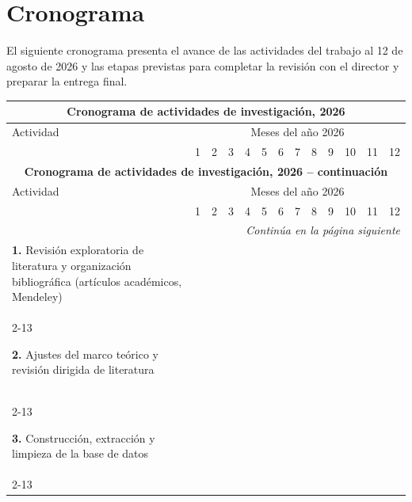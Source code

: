 \documentclass[../../TFM.tex]{subfiles}
\begin{document}

	\chapter*{Cronograma}

	El siguiente cronograma presenta el avance de las actividades del trabajo al
	12 de agosto de 2026 y las etapas previstas para completar la revisión con el
	director y preparar la entrega final.

	\begin{longtable}{|p{6.2cm}|*{12}{c|}}
		\multicolumn{13}{c}{\textbf{Cronograma de actividades de investigación, 2026}} \\[0.3em]
		\hline
		Actividad & \multicolumn{12}{c|}{Meses del año 2026} \\
		\hline
		& 1 & 2 & 3 & 4 & 5 & 6 & 7 & 8 & 9 & 10 & 11 & 12 \\
		\hline
		\endfirsthead

		\multicolumn{13}{c}{\textbf{Cronograma de actividades de investigación, 2026 -- continuación}} \\
		\hline
		Actividad & \multicolumn{12}{c|}{Meses del año 2026} \\
		\hline
		& 1 & 2 & 3 & 4 & 5 & 6 & 7 & 8 & 9 & 10 & 11 & 12 \\
		\hline
		\endhead

		\hline
		\multicolumn{13}{r}{\textit{Continúa en la página siguiente}} \\
		\endfoot

		\hline
		\endlastfoot

		\textbf{1.} Revisión exploratoria de literatura y organización bibliográfica (artículos académicos, Mendeley)
		& \cellcolor{green!20} & \cellcolor{green!20} &  &  &  &  &  &  &  &  &  &  \\
		\cline{2-13}
 
		\textbf{2.} Ajustes del marco teórico y revisión dirigida de literatura
		&  & \cellcolor{green!20} & \cellcolor{green!20} & \cellcolor{green!20} &  &  &  &  &  &  &  &  \\
		\cline{2-13}
 
		\textbf{3.} Construcción, extracción y limpieza de la base de datos
		&  & \cellcolor{green!20} & \cellcolor{green!20} & \cellcolor{green!20} &  &  &  &  &  &  &  &  \\
		\cline{2-13}
 

\end{longtable}
\end{document}
